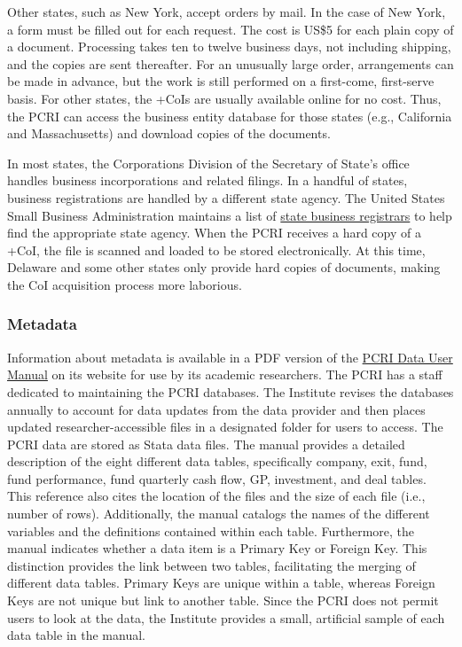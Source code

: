 \documentclass[
]{WileySix}
\begin{document}
Other states, such as New York, accept orders by mail. In the case of New York, a form must be filled out for each request. The cost is US\$5 for each plain copy of a document. Processing takes ten to twelve business days, not including shipping, and the copies are sent thereafter. For an unusually large order, arrangements can be made in advance, but the work is still performed on a first-come, first-serve basis. For other states, the +CoIs\textbar{} are usually available online for no cost. Thus, the PCRI can access the business entity database for those states (e.g., California and Massachusetts) and download copies of the documents.

In most states, the Corporations Division of the Secretary of State's office handles business incorporations and related filings. In a handful of states, business registrations are handled by a different state agency. The United States Small Business Administration maintains a list of \href{https://www.sba.gov/business-guide/launch-your-business/register-your-business\#section-header-6}{state business registrars} to help find the appropriate state agency. When the PCRI receives a hard copy of a +CoI\textbar, the file is scanned and loaded to be stored electronically. At this time, Delaware and some other states only provide hard copies of documents, making the CoI acquisition process more laborious.

\hypertarget{metadata-1}{%
\subsubsection{Metadata}\label{metadata-1}}

Information about metadata is available in a PDF version of the \href{http://privatecapitalresearchinstitute.org/images/news/pcri_manual_2_4.pdf}{PCRI Data User Manual} on its website for use by its academic researchers. The PCRI has a staff dedicated to maintaining the PCRI databases. The Institute revises the databases annually to account for data updates from the data provider and then places updated researcher-accessible files in a designated folder for users to access. The PCRI data are stored as Stata data files. The manual provides a detailed description of the eight different data tables, specifically company, exit, fund, fund performance, fund quarterly cash flow, GP, investment, and deal tables. This reference also cites the location of the files and the size of each file (i.e., number of rows). Additionally, the manual catalogs the names of the different variables and the definitions contained within each table. Furthermore, the manual indicates whether a data item is a Primary Key or Foreign Key. This distinction provides the link between two tables, facilitating the merging of different data tables. Primary Keys are unique within a table, whereas Foreign Keys are not unique but link to another table. Since the PCRI does not permit users to look at the data, the Institute provides a small, artificial sample of each data table in the manual.
\end{document}
